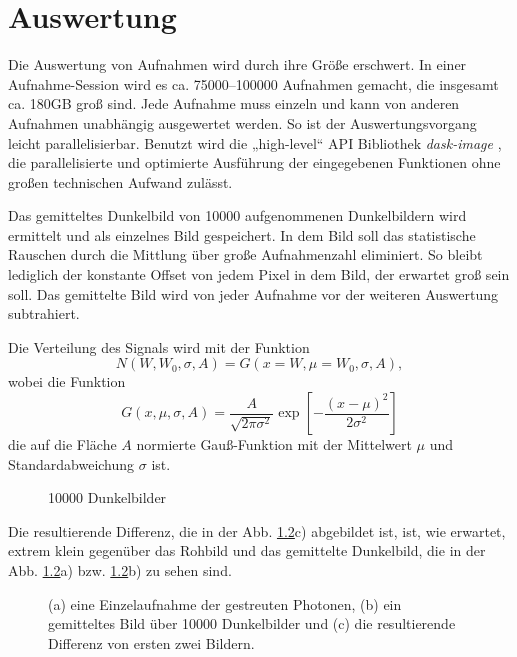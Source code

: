 \chapter{Auswertung}
\label{text:auswertung}
Die Auswertung von Aufnahmen wird durch ihre Größe erschwert. In einer Aufnahme-Session wird es ca. \numrange{75000}{100000} Aufnahmen gemacht, die insgesamt ca. 180GB groß sind. Jede Aufnahme muss einzeln und kann von anderen Aufnahmen unabhängig ausgewertet werden. So ist der Auswertungsvorgang leicht parallelisierbar. Benutzt wird die „high-level“ API Bibliothek \textit{dask-image} \cite{dask-library}, die parallelisierte und optimierte Ausführung der eingegebenen Funktionen ohne großen technischen Aufwand zulässt.

\noindent
Das gemitteltes Dunkelbild von \num{10000} aufgenommenen Dunkelbildern wird ermittelt und als einzelnes Bild gespeichert. In dem Bild soll das statistische Rauschen durch die Mittlung über große Aufnahmenzahl eliminiert. So bleibt lediglich der konstante Offset von jedem Pixel in dem Bild, der erwartet groß sein soll. Das gemittelte Bild wird von jeder Aufnahme vor der weiteren Auswertung subtrahiert.

\noindent
Die Verteilung des Signals wird mit der Funktion
\begin{equation}
    N(W, W_0, \sigma, A) = G(x=W,\mu=W_0,\sigma, A),
\end{equation}
wobei die Funktion
\begin{equation}
    G(x, \mu, \sigma, A) = \frac{A}{\sqrt{2\pi \sigma^2}}\exp\left[-\frac{(x - \mu)^2}{2\sigma^2}\right]
    \label{eq:gauss_funktion}
\end{equation}
die auf die Fläche $A$ normierte Gauß-Funktion mit der Mittelwert $\mu$ und Standardabweichung $\sigma$ ist.

\noindent
\begin{figure}[H]
    \centering
    
    \caption{\num{10000} Dunkelbilder}
    \label{fig:noise_hist_fit}
\end{figure}

\noindent
Die resultierende Differenz, die in der Abb. \ref{fig:capture_ped_diff}c) abgebildet ist, ist, wie erwartet, extrem klein gegenüber das Rohbild und das gemittelte Dunkelbild, die in der Abb. \ref{fig:capture_ped_diff}a) bzw. \ref{fig:capture_ped_diff}b) zu sehen sind. 
\begin{figure}[H]
    \centering
    
    \caption{(a) eine Einzelaufnahme der gestreuten Photonen, (b) ein gemitteltes Bild über \num{10000} Dunkelbilder und (c) die resultierende Differenz von ersten zwei Bildern.}
    \label{fig:capture_ped_diff}
\end{figure}

